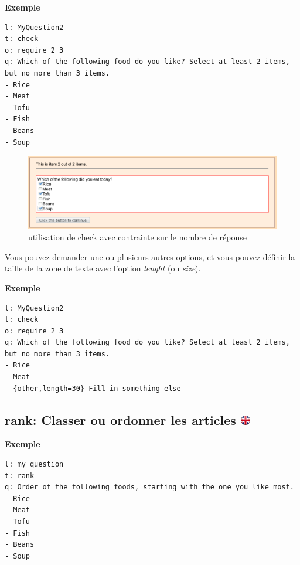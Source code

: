 \documentclass[
]{book}
\begin{document}
\textbf{Exemple}

\begin{verbatim}
l: MyQuestion2
t: check
o: require 2 3
q: Which of the following food do you like? Select at least 2 items, but no more than 3 items.
- Rice
- Meat
- Tofu
- Fish
- Beans
- Soup
\end{verbatim}

\begin{figure}
\centering
\includegraphics{img/check.png}
\caption{utilisation de check avec contrainte sur le nombre de réponse}
\end{figure}

Vous pouvez demander une ou plusieurs autres options, et vous pouvez définir la taille de la zone de texte avec l'option \emph{lenght} (ou \emph{size}).

\textbf{Exemple}

\begin{verbatim}
l: MyQuestion2
t: check
o: require 2 3
q: Which of the following food do you like? Select at least 2 items, but no more than 3 items.
- Rice
- Meat
- {other,length=30} Fill in something else
\end{verbatim}

\hypertarget{rank-classer-ou-ordonner-les-articles}{%
\subsection[rank: Classer ou ordonner les articles ]{\texorpdfstring{rank: Classer ou ordonner les articles \href{https://www.psytoolkit.org/doc3.4.0/online-survey-syntax.html\#rank}{\protect\includegraphics{img/ukflag.png}}}{rank: Classer ou ordonner les articles }}\label{rank-classer-ou-ordonner-les-articles}}

\textbf{Exemple}

\begin{verbatim}
l: my_question
t: rank
q: Order of the following foods, starting with the one you like most.
- Rice
- Meat
- Tofu
- Fish
- Beans
- Soup
\end{verbatim}
\end{document}
